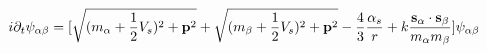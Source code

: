 \begin{equation}                      
i \partial_{t} \psi_{\alpha \beta} =                       
[\sqrt{(m_{\alpha} + \frac{1}{2} V_{s})^{2} + {\bf p}^{2}} +                      
\sqrt{(m_{\beta} + \frac{1}{2} V_{s})^{2} + {\bf p}^{2}} -\frac{4}{3}                      
\frac{\alpha_{s}}{r} + k \frac{{\bf s}_{\alpha} \cdot{\bf s}_{\beta}}                      
{m_{\alpha} m_{\beta}}] \psi_{\alpha \beta}                      
\end{equation} 
